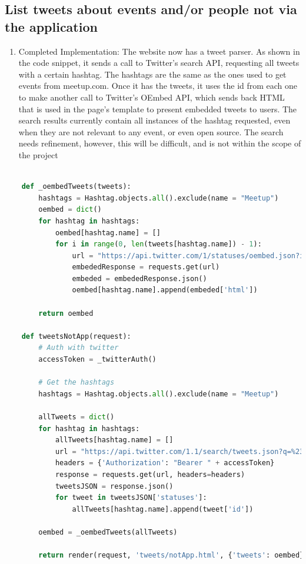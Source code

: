 \documentclass[draftclsnofoot,10pt,onecolumn]{IEEEtran} %
\begin{document}
\subsection{List tweets about events and/or people not via the application}
\begin{enumerate}
  \item Completed Implementation: The website now has a tweet parser. As shown
    in the code snippet, it sends a call to Twitter's search API, requesting all
    tweets with a certain hashtag. The hashtags are the same as the ones used to
    get events from meetup.com. Once it has the tweets, it uses the id from each
    one to make another call to Twitter's OEmbed API, which sends back HTML that
    is used in the page's template to present embedded tweets to users.  The
    search results currently contain all instances of the hashtag requested,
    even when they are not relevant to any event, or even open source. The
    search needs refinement, however, this will be difficult, and is not within
    the scope of the project
\end{enumerate}

\begin{center}
\captionsetup{width=.5\linewidth}
  \begin{lstlisting}[caption=Views.py showing the Twitter authorization and
  searching for tweets for the tweets not from the application, language=Python]
   
    def _oembedTweets(tweets):
        hashtags = Hashtag.objects.all().exclude(name = "Meetup")
        oembed = dict()
        for hashtag in hashtags:
            oembed[hashtag.name] = []
            for i in range(0, len(tweets[hashtag.name]) - 1):
                url = "https://api.twitter.com/1/statuses/oembed.json?id=" + str(tweets[hashtag.name][i])
                embededResponse = requests.get(url)
                embeded = embededResponse.json()
                oembed[hashtag.name].append(embeded['html'])

        return oembed

    def tweetsNotApp(request):
        # Auth with twitter
        accessToken = _twitterAuth()

        # Get the hashtags
        hashtags = Hashtag.objects.all().exclude(name = "Meetup")

        allTweets = dict()
        for hashtag in hashtags:
            allTweets[hashtag.name] = []
            url = "https://api.twitter.com/1.1/search/tweets.json?q=%23" + hashtag.name + "&src=typd"
            headers = {'Authorization': "Bearer " + accessToken}
            response = requests.get(url, headers=headers)
            tweetsJSON = response.json()
            for tweet in tweetsJSON['statuses']:
                allTweets[hashtag.name].append(tweet['id'])

        oembed = _oembedTweets(allTweets)

        return render(request, 'tweets/notApp.html', {'tweets': oembed})
  \end{lstlisting}
\end{center}
\end{document}
